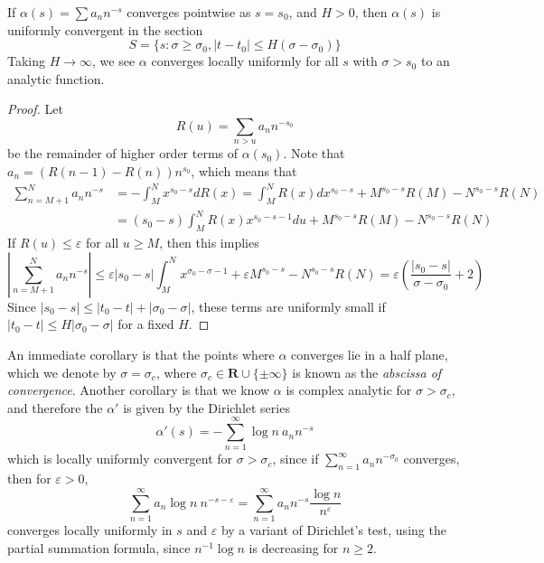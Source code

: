 \begin{theorem}
    If $\alpha(s) = \sum a_n n^{-s}$ converges pointwise as $s = s_0$, and $H > 0$, then $\alpha(s)$ is uniformly convergent in the section
    \[ S = \{ s: \sigma \geq \sigma_0, |t - t_0| \leq H(\sigma - \sigma_0) \} \]
    Taking $H \to \infty$, we see $\alpha$ converges locally uniformly for all $s$ with $\sigma > s_0$ to an analytic function.
\end{theorem}
\begin{proof}
    Let
    \[ R(u) = \sum_{n > u} a_n n^{-s_0} \]
    be the remainder of higher order terms of $\alpha(s_0)$. Note that $a_n = (R(n-1)-R(n))n^{s_0}$, which means that
    \begin{align*}
        \sum_{n = M+1}^N a_n n^{-s} &= - \int_M^N x^{s_0-s} dR(x) = \int_M^N R(x) dx^{s_0 - s} + M^{s_0 - s} R(M) - N^{s_0 - s} R(N)\\
        &= (s_0 - s) \int_M^N R(x) x^{s_0 - s - 1} du + M^{s_0 - s} R(M) - N^{s_0 - s} R(N)
    \end{align*}
    If $R(u) \leq \varepsilon$ for all $u \geq M$, then this implies
    \[ \left| \sum_{n = M+1}^N a_n n^{-s} \right| \leq \varepsilon |s_0 - s| \int_M^N x^{\sigma_0 - \sigma - 1} + \varepsilon M^{s_0 - s} - N^{s_0 - s} R(N) = \varepsilon \left( \frac{|s_0 - s|}{\sigma - \sigma_0} + 2 \right) \]
    Since $|s_0 - s| \leq |t_0 - t| + |\sigma_0 - \sigma|$, these terms are uniformly small if $|t_0 - t| \leq H |\sigma_0 - \sigma|$ for a fixed $H$.
\end{proof}

An immediate corollary is that the points where $\alpha$ converges lie in a half plane, which we denote by $\sigma = \sigma_c$, where $\sigma_c \in \mathbf{R} \cup \{ \pm \infty \}$ is known as the {\it abscissa of convergence}. Another corollary is that we know $\alpha$ is complex analytic for $\sigma > \sigma_c$, and therefore the $\alpha'$ is given by the Dirichlet series
%
\[ \alpha'(s) = - \sum_{n = 1}^\infty \log n\ a_n n^{-s} \]
%
which is locally uniformly convergent for $\sigma > \sigma_c$, since if $\sum_{n = 1}^\infty a_n n^{-\sigma_0}$ converges, then for $\varepsilon > 0$,
%
\[ \sum_{n = 1}^\infty a_n \log n\ n^{-s-\varepsilon} = \sum_{n = 1}^\infty a_n n^{-s} \frac{\log n}{n^\varepsilon} \]
%
converges locally uniformly in $s$ and $\varepsilon$ by a variant of Dirichlet's test, using the partial summation formula, since $n^{-1} \log n$ is decreasing for $n \geq 2$.

